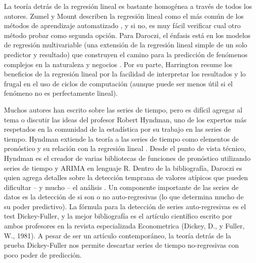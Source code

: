 \begin{spacing}{1.5}
La teoría detrás de la regresión lineal es bastante homogénea a través de todos los autores. Zumel y Mount describen la regresión lineal como el más común de los métodos de aprendizaje automatizado \cite{zumelMount}, y si no, es muy fácil verificar cual otro método probar como segunda opción. Para Daroczi, el énfasis está en los modelos de regresión multivariable (una extensión de la regresión lineal simple de un solo predictor y resultado) que construyen el camino para la predicción de fenómenos complejos en la naturaleza y negocios \cite{daroczi}. Por su parte, Harrington resume los beneficios de la regresión lineal \cite{harrington} por la facilidad de interpretar los resultados y lo frugal en el uso de ciclos de computación (aunque puede ser menos útil si el fenómeno no es perfectamente lineal).
 
Muchos autores han escrito sobre las series de tiempo, pero es difícil agregar al tema o discutir las ideas del profesor Robert Hyndman, uno de los expertos más respetados en la comunidad de la estadística por su trabajo en las series de tiempo. Hyndman extiende la teoría a las series de tiempo como elementos de pronóstico y su relación con la regresión lineal \cite{hyndman}. Desde el punto de vista técnico, Hyndman es el creador de varias bibliotecas de funciones de pronóstico utilizando series de tiempo y ARIMA en lenguaje R. Dentro de la bibliografía, Daroczi es quien agrega detalles sobre la detección temprana de valores atípicos que pueden dificultar – y mucho – el análisis \cite{daroczi}. Un componente importante de las series de datos es la detección de si son o no auto-regresivas (lo que determina mucho de su poder predictivo). La fórmula para la detección de series auto-regresivas es el test Dickey-Fuller, y la mejor bibliografía es el artículo científico escrito por ambos profesores en la revista especializada Econometrica (Dickey, D., y Fuller, W., 1981). A pesar de ser un artículo contemporáneo, la teoría detrás de la prueba Dickey-Fuller nos permite descartar series de tiempo no-regresivas con poco poder de predicción.
 

\end{spacing}
